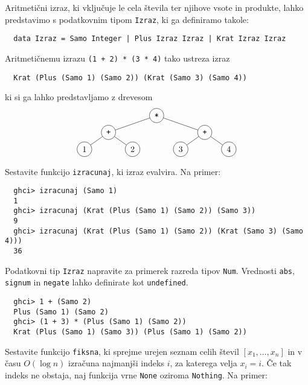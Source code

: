 \documentclass[arhiv]{../izpit}
\begin{document}


Aritmetični izraz, ki vključuje le cela števila ter njihove vsote in produkte,
lahko predstavimo s podatkovnim tipom \texttt{Izraz}, ki ga definiramo takole:
\begin{verbatim}
  data Izraz = Samo Integer | Plus Izraz Izraz | Krat Izraz Izraz
\end{verbatim}
Aritmetičnemu izrazu \texttt{(1 + 2) * (3 * 4)} tako ustreza izraz
\begin{verbatim}
  Krat (Plus (Samo 1) (Samo 2)) (Krat (Samo 3) (Samo 4))
\end{verbatim}
ki si ga lahko predstavljamo z drevesom
\[
  \begin{tikzpicture}[level distance=0.7cm,
    level 1/.style={sibling distance=4cm},
    level 2/.style={sibling distance=2cm},
    level 3/.style={sibling distance=2cm}
    ]
    \node[circle, draw] {\texttt{*}}
      child {node[circle, draw] {\texttt{+}}
        child {node[circle, draw] {1}}
        child {node[circle, draw] {2}}
      }
      child {node[circle, draw] {\texttt{+}}
        child {node[circle, draw] {3}}
        child {node[circle, draw] {4}}
      };
  \end{tikzpicture}
\]

\podnaloga
  Sestavite funkcijo \texttt{izracunaj}, ki izraz evalvira. Na primer:
  \begin{verbatim}
  ghci> izracunaj (Samo 1)
  1
  ghci> izracunaj (Krat (Plus (Samo 1) (Samo 2)) (Samo 3))
  9
  ghci> izracunaj (Krat (Plus (Samo 1) (Samo 2)) (Krat (Samo 3) (Samo 4)))
  36
  \end{verbatim}

\podnaloga
  Podatkovni tip \texttt{Izraz} napravite za primerek razreda tipov \texttt{Num}.
  Vrednosti \texttt{abs}, \texttt{signum} in \texttt{negate} lahko definirate kot \texttt{undefined}.
  \begin{verbatim}
  ghci> 1 + (Samo 2)
  Plus (Samo 1) (Samo 2)
  ghci> (1 + 3) * (Plus (Samo 1) (Samo 2))
  Krat (Plus (Samo 1) (Samo 3)) (Plus (Samo 1) (Samo 2))
  \end{verbatim}

  Sestavite funkcijo \texttt{fiksna}, ki sprejme urejen seznam celih števil 
  $[x_1, \dots, x_n]$ in v času $O(\log n)$ izračuna najmanjši indeks $i$, za katerega velja $x_i = i$.
  Če tak indeks ne obstaja, naj funkcija vrne \texttt{None} oziroma \texttt{Nothing}.
  Na primer:
\end{document}
